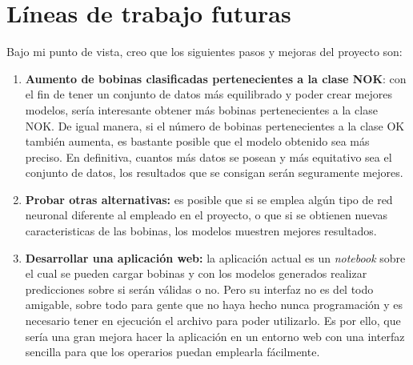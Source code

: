 \section{Líneas de trabajo futuras}
Bajo mi punto de vista, creo que los siguientes pasos y mejoras del proyecto son:
\begin{enumerate}
    \item \textbf{Aumento de bobinas clasificadas pertenecientes a la clase NOK}: con el fin de tener un conjunto de datos más equilibrado y poder crear mejores modelos, sería interesante obtener más bobinas pertenecientes a la clase NOK. De igual manera, si el número de bobinas pertenecientes a la clase OK también aumenta, es bastante posible que el modelo obtenido sea más preciso. En definitiva, cuantos más datos se posean y más equitativo sea el conjunto de datos, los resultados que se consigan serán seguramente mejores.
    \item \textbf{Probar otras alternativas:} es posible que si se emplea algún tipo de red neuronal diferente al empleado en el proyecto, o que si se obtienen nuevas caracteristicas de las bobinas, los modelos muestren mejores resultados. 
    \item \textbf{Desarrollar una aplicación web:} la aplicación actual es un \emph{notebook} sobre el cual se pueden cargar bobinas y con los modelos generados realizar predicciones sobre si serán válidas o no. Pero su interfaz no es del todo amigable, sobre todo para gente que no haya hecho nunca programación y es necesario tener en ejecución el archivo para poder utilizarlo. Es por ello, que sería una gran mejora hacer la aplicación en un entorno web con una interfaz sencilla para que los operarios puedan emplearla fácilmente.
\end{enumerate}
